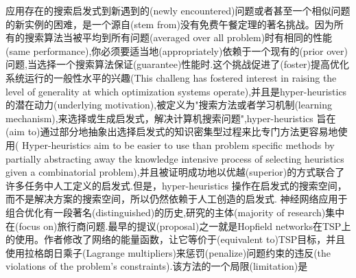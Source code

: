 \documentclass[a4paper,UTF8]{ctexart}
\theoremstyle{definition}
\begin{document}
应用存在的搜索启发式到新遇到的(newly encountered)问题或者甚至一个相似问题的新实例的困难，是一个源自(stem from)没有免费午餐定理的著名挑战。因为所有的搜索算法当被平均到所有问题(averaged over all problem)时有相同的性能(same performance),你必须要适当地(appropriately)依赖于一个现有的(prior over)问题,当选择一个搜索算法保证(guarantee)性能时.这个挑战促进了(foster)提高优化系统运行的一般性水平的兴趣(This challeng has fostered interest in raising the level of generality at which optimization systems operate),并且是hyper-heuristics的潜在动力(underlying motivation),被定义为"搜索方法或者学习机制(learning mechanism),来选择或生成启发式，解决计算机搜索问题",hyper-heuristics 旨在(aim to)通过部分地抽象出选择启发式的知识密集型过程来比专门方法更容易地使用( Hyper-heuristics aim to be easier to use than problem specific methods by partially abstracting away the knowledge intensive process of selecting heuristics given a combinatorial problem),并且被证明成功地以优越(superior)的方式联合了许多任务中人工定义的启发式.但是，hyper-heuristics 操作在启发式的搜索空间，而不是解决方案的搜索空间，所以仍然依赖于人工创造的启发式.
神经网络应用于组合优化有一段著名(distinguished)的历史,研究的主体(majority of research)集中在(focus on)旅行商问题.最早的提议(proposal)之一就是Hopfield networks在TSP上的使用。作者修改了网络的能量函数，让它等价于(equivalent to)TSP目标，并且使用拉格朗日乘子(Lagrange multipliers)来惩罚(penalize)问题约束的违反(the violations of the problem's constraints).该方法的一个局限(limitation)是
\end{document}
